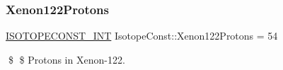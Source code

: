 \subsubsection{\texorpdfstring{Xenon122\+Protons}{Xenon122Protons}}
{\footnotesize\ttfamily \mbox{\hyperlink{group___isotope_const-_macros_ga5f18360b3e99483a35c32d789e62621c}{I\+S\+O\+T\+O\+P\+E\+C\+O\+N\+S\+T\+\_\+\+I\+NT}} Isotope\+Const\+::\+Xenon122\+Protons = 54}

\$ \$ Protons in Xenon-\/122. 